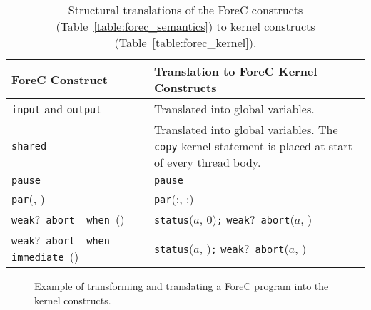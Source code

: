 \begin{table}
	\centering
	\renewcommand{\arraystretch}{1.25}
	
	\begin{tabular}{| l | p{8cm} |}
		\hline
		\bf{ForeC Construct}													& \bf{Translation to ForeC Kernel Constructs}											\\ 
		\hline
		\verb$input$ and \verb$output$											& Translated into global variables.														\\ \hline
		\verb$shared$															& Translated into global variables. The \verb$copy$ kernel statement is placed at 
																				  start of every thread body.															\\ \hline
		\verb$pause$															& \verb$pause$																			\\ \hline
		\verb$par$(\body{}, \body{})											& \verb$par$(\thread{}:\body{}, \thread{}:\body{})										\\ \hline
		\verb$weak$?~\verb$abort$~\body{}~\verb$when$~(\expression{})			& \verb$status$($a$, 0)\verb$;$ \verb$weak$?~\verb$abort$($a$, \body{})					\\ \hline
		\verb$weak$?~\verb$abort$~\body{}~\verb$when immediate$~(\expression{})	& \verb$status$($a$, \expression{})\verb$;$ \verb$weak$?~\verb$abort$($a$, \body{})		\\ \hline
	\end{tabular}
	
	\caption{Structural translations of the ForeC constructs  
			 (Table~\ref{table:forec_semantics}) to kernel constructs 
			 (Table~\ref{table:forec_kernel}).}
	\label{table:forec_structural_translations}
\end{table}

\begin{figure}
	\centering 
	\hfill
	
	
	\caption{Example of transforming and translating a ForeC program into the kernel constructs.}
	\label{fig:transform_forec}
\end{figure}


